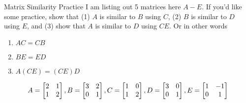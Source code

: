 \documentclass[xcoler=dvipsnames, aspectratio=169]{beamer}
\date{Similarity Practice}
\begin{document}
    \begin{frame}{Matrix Similarity Practice}
        I am listing out 5 matrices here $A-E$. If you'd like some practice, show that
        (1) $A$ is similar to $B$ using $C$, (2) $B$ is similar to $D$ using $E$, and (3)
        show that $A$ is similar to $D$ using $CE$. Or in other words
        \begin{enumerate}
            \item $AC = CB$
            \item $BE = ED$
            \item $A(CE) = (CE)D$
        \end{enumerate}
        \[
            A = \begin{bmatrix}
                2 & 1\\
                1 & 2
            \end{bmatrix},B = \begin{bmatrix}
                3 & 2\\
                0 & 1
            \end{bmatrix}, C= \begin{bmatrix}
                1 & 0\\
                1 & 2
            \end{bmatrix}, D = \begin{bmatrix}
                3 & 0\\
                0 & 1
            \end{bmatrix}, E = \begin{bmatrix}
                1 & -1\\
                0 & 1
            \end{bmatrix}
        \]
    \end{frame}
\end{document}
